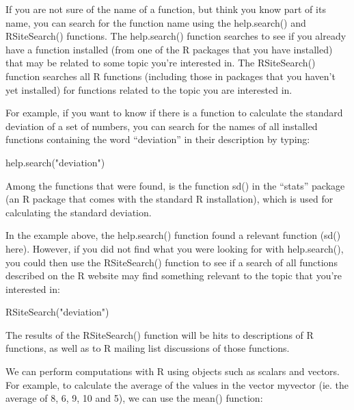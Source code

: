 \documentclass[
]{book}
\newenvironment{Shaded}{\begin{snugshade}}{\end{snugshade}}
\newcommand{\FunctionTok}[1]{\textcolor[rgb]{0.00,0.00,0.00}{#1}}
\newcommand{\NormalTok}[1]{#1}
\newcommand{\StringTok}[1]{\textcolor[rgb]{0.31,0.60,0.02}{#1}}
\begin{document}
If you are not sure of the name of a function, but think you know part of its name, you can search for the function name using the help.search() and RSiteSearch() functions. The help.search() function searches to see if you already have a function installed (from one of the R packages that you have installed) that may be related to some topic you're interested in. The RSiteSearch() function searches all R functions (including those in packages that you haven't yet installed) for functions related to the topic you are interested in.

For example, if you want to know if there is a function to calculate the standard deviation of a set of numbers, you can search for the names of all installed functions containing the word ``deviation'' in their description by typing:

\begin{Shaded}
\begin{Highlighting}[]
\FunctionTok{help.search}\NormalTok{(}\StringTok{"deviation"}\NormalTok{)}
\end{Highlighting}
\end{Shaded}

Among the functions that were found, is the function sd() in the ``stats'' package (an R package that comes with the standard R installation), which is used for calculating the standard deviation.

In the example above, the help.search() function found a relevant function (sd() here). However, if you did not find what you were looking for with help.search(), you could then use the RSiteSearch() function to see if a search of all functions described on the R website may find something relevant to the topic that you're interested in:

\begin{Shaded}
\begin{Highlighting}[]
\FunctionTok{RSiteSearch}\NormalTok{(}\StringTok{"deviation"}\NormalTok{)}
\end{Highlighting}
\end{Shaded}

The results of the RSiteSearch() function will be hits to descriptions of R functions, as well as to R mailing list discussions of those functions.

We can perform computations with R using objects such as scalars and vectors. For example, to calculate the average of the values in the vector myvector (ie. the average of 8, 6, 9, 10 and 5), we can use the mean() function:
\end{document}
